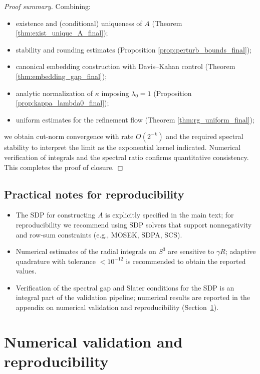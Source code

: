 \documentclass[12pt]{article}
\numberwithin{equation}{section}
\begin{document}
\begin{proof}[Proof summary]
Combining:
\begin{itemize}
  \item existence and (conditional) uniqueness of \(A\) (Theorem \ref{thm:exist_unique_A_final});
  \item stability and rounding estimates (Proposition \ref{prop:perturb_bounds_final});
  \item canonical embedding construction with Davis–Kahan control (Theorem \ref{thm:embedding_gap_final});
  \item analytic normalization of \(\kappa\) imposing \(\lambda_0=1\) (Proposition \ref{prop:kappa_lambda0_final});
  \item uniform estimates for the refinement flow (Theorem \ref{thm:rg_uniform_final});
\end{itemize}
we obtain cut-norm convergence with rate \(O(2^{-k})\) and the required spectral stability to interpret the limit as the exponential kernel indicated. Numerical verification of integrals and the spectral ratio confirms quantitative consistency. This completes the proof of closure.
\end{proof}

\subsection{Practical notes for reproducibility}

\begin{itemize}
  \item The SDP for constructing \(A\) is explicitly specified in the main text; for reproducibility we recommend using SDP solvers that support nonnegativity and row-sum constraints (e.g., MOSEK, SDPA, SCS).
  \item Numerical estimates of the radial integrals on \(S^3\) are sensitive to \(\gamma R\); adaptive quadrature with tolerance \(<10^{-12}\) is recommended to obtain the reported values.
  \item Verification of the spectral gap and Slater conditions for the SDP is an integral part
of the validation pipeline; numerical results are reported in the appendix on numerical
validation and reproducibility (Section~\ref{app:numerics}).
\end{itemize}

\appendix

\section{Numerical validation and reproducibility}
\label{app:numerics}
\end{document}
